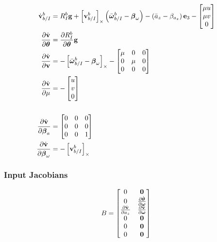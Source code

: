 \begin{align*}
  \dot{\boldsymbol{\mathrm{v}}}_{b/I}^b 
  &=
  R_I^b \boldsymbol{\mathrm{g}}
  +
  \left[ \boldsymbol{\mathrm{v}}_{b/I}^b \right]_{\times}
  \left( \bar{\boldsymbol{\mathrm{\omega}}}_{b/I}^b - \boldsymbol{\mathrm{\beta}}_\omega \right)
  -
  \left( \bar{a}_z - \beta_{a_z} \right) \boldsymbol{\mathrm{e}}_3
  -
  \begin{bmatrix}
    \mu u \\
    \mu v \\
    0
  \end{bmatrix} \\
  \frac{\partial \dot{\boldsymbol{\mathrm{v}}}}{\partial \boldsymbol{\mathrm{\theta}}} &= 
  \frac{\partial R_I^b}{\partial \boldsymbol{\mathrm{\theta}}} \boldsymbol{\mathrm{g}} \\
  \frac{\partial \dot{\boldsymbol{\mathrm{v}}}}{\partial \boldsymbol{\mathrm{v}}} &= 
  -\left[ \bar{\boldsymbol{\mathrm{\omega}}}_{b/I}^b - \boldsymbol{\mathrm{\beta}}_\omega \right]_{\times} -
  \begin{bmatrix}
    \mu & 0 & 0 \\
    0 & \mu & 0 \\
    0 & 0 & 0
  \end{bmatrix}\\
  \frac{\partial \dot{\boldsymbol{\mathrm{v}}}}{\partial \mu} &= -
  \begin{bmatrix}
    u \\ v \\ 0
  \end{bmatrix}\\
  \\
  \frac{\partial \dot{\boldsymbol{\mathrm{v}}}}{\partial \boldsymbol{\mathrm{\beta}}_a} &= 
  \begin{bmatrix}
    0 & 0 & 0 \\
    0 & 0 & 0 \\
    0 & 0 & 1
  \end{bmatrix}\\
  \frac{\partial \dot{\boldsymbol{\mathrm{v}}}}{\partial \boldsymbol{\mathrm{\beta}}_\omega} &= 
  - \left[ \boldsymbol{\mathrm{v}}_{b/I}^b \right]_{\times}
\end{align*}

\subsubsection{Input Jacobians}
\begin{equation}
  B =
  \begin{bmatrix}
    0 & \boldsymbol{\mathrm{0}} \\
    0 & \frac{\partial \dot{\boldsymbol{\mathrm{\theta}}}}{\partial \boldsymbol{\mathrm{\omega}}} \\
    \frac{\partial \dot{\boldsymbol{\mathrm{v}}}}{\partial a_z} & \frac{\partial
      \dot{\boldsymbol{\mathrm{v}}}}{\partial \boldsymbol{\mathrm{\omega}}} \\
    0 & \boldsymbol{\mathrm{0}} \\
    0 & \boldsymbol{\mathrm{0}} \\
    0 & \boldsymbol{\mathrm{0}}
  \end{bmatrix}
\end{equation}

